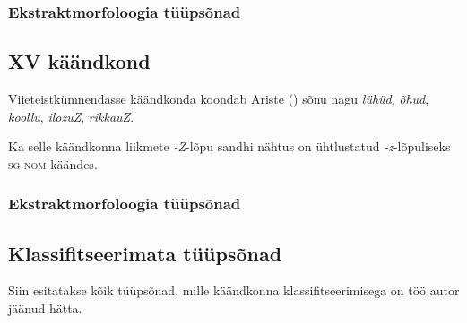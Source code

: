 \documentclass[12pt,a4paper]{article}
\newcommand{\vadja}[1]{\textit{#1}}
\newcommand{\msd}[1]{\textsc{#1}}
\begin{document}
\subsubsection*{Ekstraktmorfoloogia tüüpsõnad}
\vspace{-3.5em}



























\subsection{\RN{15} käändkond}

Viieteistkümnendasse käändkonda koondab Ariste (\citeyear[51]{ariste_grammar_1968}) sõnu nagu \vadja{lühüd}, \vadja{õhud}, \vadja{koollu}, \vadja{ilozuZ}, \vadja{rikkauZ}.

Ka selle käändkonna liikmete \vadja{-Z}-lõpu sandhi nähtus on ühtlustatud \vadja{-z}-lõpuliseks \msd{sg nom} käändes.


\subsubsection*{Ekstraktmorfoloogia tüüpsõnad}
\vspace{-3.5em}
















\subsection{Klassifitseerimata tüüpsõnad}

Siin esitatakse kõik tüüpsõnad, mille käändkonna klassifitseerimisega on töö autor jäänud hätta.
\end{document}
